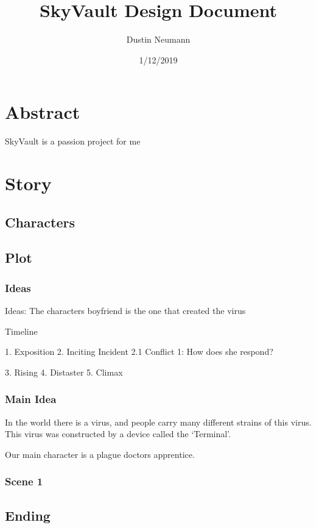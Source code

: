 \documentclass{article}
\begin{document}
\author{Dustin Neumann}
\title{SkyVault Design Document}
\date{1/12/2019}
\maketitle

\section{Abstract}
SkyVault is a passion project for me

\section{Story} 

\subsection{Characters}
\subsection{Plot}

\subsubsection{Ideas}
Ideas:
The characters boyfriend is the one that created the virus

\begin{bfseries}
    Timeline
\end{bfseries}


1. Exposition
2. Inciting Incident
    2.1 Conflict 1: How does she respond?

3. Rising
4. Distaster
5. Climax

\subsubsection{Main Idea}
In the world there is a virus, and people carry many different strains of this virus. This virus was constructed by a device called the `Terminal'.

Our main character is a plague doctors apprentice.

\subsubsection{Scene 1}


\subsection{Ending} 
\end{document}

